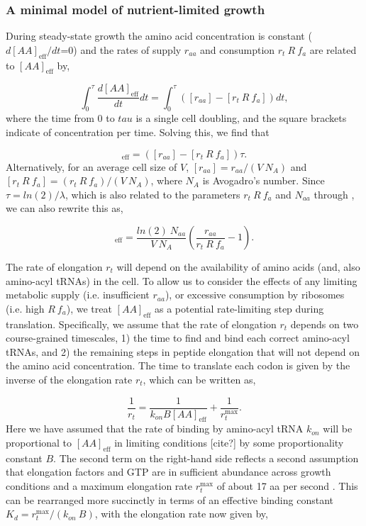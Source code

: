 \subsubsection{A minimal model of nutrient-limited growth}

During steady-state
growth the amino acid concentration is constant ($d[AA]_{\text{eff}}/dt$=0) and the rates of supply
$r_{aa}$ and consumption $r_t \ R \ f_a$ are related to $[AA]_{\text{eff}}$ by,

\begin{equation}
\int_{0}^{\tau} \frac{d[AA]_{\text{eff}}}{dt} dt =  \int_{0}^{\tau} ([r_{aa}] - [r_t \ R \ f_a]) dt,
\end{equation}
where the time from 0 to $tau$ is a single cell doubling, and the square brackets indicate of concentration per time. Solving this, we find that

\begin{equation}
[AA]_{\text{eff}} =  ([r_{aa}] - [r_t \ R \ f_a]) \tau.
\end{equation}
Alternatively, for an average cell size of $V$,  $[r_{aa}] = r_{aa}/(V \ N_A)$
and $[r_t \ R \ f_a] = (r_t \ R \ f_a)/(V \ N_A)$, where $N_A$ is Avogadro's
number. Since $\tau = ln(2)/\lambda$, which is also related to the parameters
$r_t \ R \ f_a$ and $N_{aa}$ through , we
can also rewrite this as,

\begin{equation}
[AA]_{\text{eff}} = \frac{ln(2) \ N_{aa}}{V \ N_A} \left(\frac{r_{aa}}{r_t \ R \ f_a} - 1 \right) .
\label{eq:aa_final}
\end{equation}

The rate of elongation $r_t$ will depend on the availability of amino acids
(and, also amino-acyl tRNAs) in the cell. To allow us to consider the effects of
any limiting metabolic supply (i.e. insufficient $r_{aa}$), or excessive
consumption by ribosomes (i.e. high $R \ f_a$), we treat $[AA]_{\text{eff}}$ as
a potential rate-limiting step during translation. Specifically, we assume that
the rate of elongation $r_t$ depends on two course-grained timescales, 1) the
time to find and bind each correct amino-acyl tRNAs, and 2) the remaining steps
in peptide elongation that will not depend on the amino acid concentration. The
time to translate each codon is given by the inverse of the elongation rate
$r_t$, which can be written as,

\begin{equation}
\frac{1}{r_t} = \frac{1}{k_{on} B [AA]_{\text{eff}}} + \frac{1}{r_{t}^{\text{max}}}.
\end{equation}
Here we have assumed that the rate of binding by amino-acyl tRNA $k_{on}$ will
be proportional to $[AA]_{\text{eff}}$ in limiting conditions [cite?] by some
proportionality constant $B$. The second term on the right-hand side reflects a second
assumption that elongation factors and GTP are in sufficient abundance across
growth conditions and a maximum elongation rate $r_{t}^{\text{max}}$
of about 17 aa per second \cite{dai2016}. This can be rearranged more succinctly in
terms of an effective binding constant $K_d = r_{t}^{\text{max}}/ (k_{on} \ B)$, with
the elongation rate now given by,

